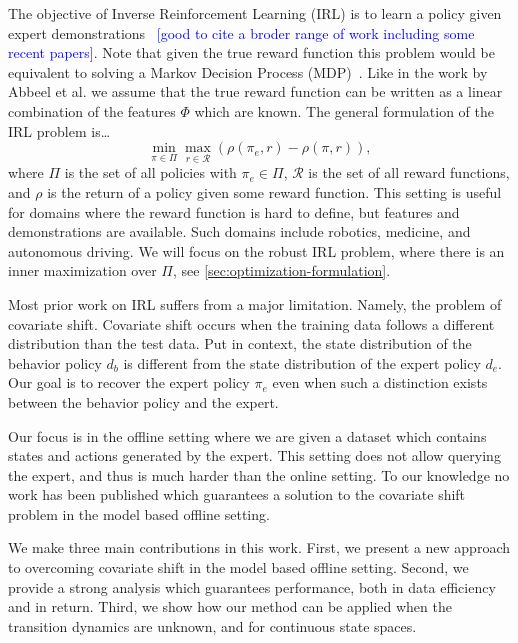 \documentclass[11pt]{article}
\newcommand{\mm}[1]{\textcolor{blue}{[#1]}}
\begin{document}
The objective of Inverse Reinforcement Learning (IRL) is to learn a policy given expert demonstrations~\cite{abbeel2004, chang2021mitigating}
\mm{good to cite a broder range of work including some recent papers}. 
Note that given the true reward function this problem would be equivalent to solving a Markov Decision Process (MDP)~\cite{PUTERMAN}.
Like in the work by Abbeel et al. we assume that the true reward function can be written as a linear combination of the features $\Phi$ which are known. 
The general formulation of the IRL problem is\dots
\begin{equation} \label{eq:IRL_formulation}
	\min_{\pi \in \Pi} \max_{r \in \mathcal{R}} (\rho(\pi_e, r) - \rho(\pi, r)),
\end{equation}
where $\Pi$ is the set of all policies with $\pi_e \in \Pi$, $\mathcal{R}$ is the set of all reward functions, and $\rho$ is the return of a policy given some reward function. This setting is useful for domains where the reward function is hard to define, but features and demonstrations are available. Such domains include robotics, medicine, and autonomous driving. We will focus on the robust IRL problem, where there is an inner maximization over $\Pi$, see \cref{sec:optimization-formulation}.

Most prior work on IRL suffers from a major limitation. Namely, the problem of covariate shift. Covariate shift occurs when the training data follows a different distribution than the test data. Put in context, the state distribution of the behavior policy $d_b$ is different from the state distribution of the expert policy $d_e$. Our goal is to recover the expert policy $\pi_e$ even when such a distinction exists between the behavior policy and the expert.

Our focus is in the offline setting where we are given a dataset which contains states and actions generated by the expert. This setting does not allow querying the expert, and thus is much harder than the online setting. To our knowledge no work has been published which guarantees a solution to the covariate shift problem in the model based offline setting.

We make three main contributions in this work. First, we present a new approach to overcoming covariate shift in the model based offline setting. Second, we provide a strong analysis which guarantees performance, both in data efficiency and in return. Third, we show how our method can be applied when the transition dynamics are unknown, and for continuous state spaces.
\end{document}
